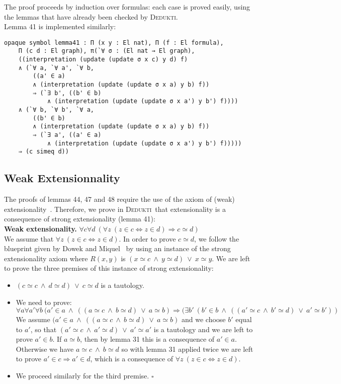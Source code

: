 \documentclass[submission,copyright,creativecommons]{eptcs}
\def\imp{\mathbin{\Rightarrow}}
\def\fa{{\forall}}
\def\conj{\mathbin{\wedge}}
\def\disj{\mathbin{\vee}}
\def\ex{{\exists}}
\newenvironment{proof}{\noindent {\em Proof.}}{\medskip}
\newcommand{\dedukti}{\textsc{Dedukti}}
\begin{document}
The proof proceeds by induction over formulas: each case is proved easily, using the lemmas that have already been checked by \dedukti. \\

Lemma 41 is implemented similarly:

\begin{lstlisting}
opaque symbol lemma41 : Π (x y : El nat), Π (f : El formula), 
	Π (c d : El graph), π(`∀ σ : (El nat → El graph), 
	((interpretation (update (update σ x c) y d) f)
	∧ (`∀ a, `∀ a', `∀ b, 
		((a' ∈ a) 
		∧ (interpretation (update (update σ x a) y b) f)) 
		⇒ (`∃ b', ((b' ∈ b) 
			∧ (interpretation (update (update σ x a') y b') f))))
	∧ (`∀ b, `∀ b', `∀ a, 
		((b' ∈ b) 
		∧ (interpretation (update (update σ x a) y b) f)) 
		⇒ (`∃ a', ((a' ∈ a) 
			∧ (interpretation (update (update σ x a') y b') f))))) 
	⇒ (c simeq d))
\end{lstlisting}

\subsection{Weak Extensionnality}

\label{extensionality}

The proofs of lemmas 44, 47 and 48 require the use of the axiom of (weak) extensionality~\cite{zermodulo53}. Therefore, we prove in \dedukti ~that extensionality is a consequence of strong extensionality (lemma 41):\\

\textbf{Weak extensionality.} $\fa c\fa d~ (\fa z~ (z \in c \Leftrightarrow z \in d) \imp c \simeq d)$ \\


\begin{proof}
We assume that $\fa z~ (z \in c \Leftrightarrow z \in d)$. In order to prove $c \simeq d$, we follow the blueprint given by Dowek and Miquel~\cite[see Proposition 1]{zermodulo} by using an instance of the strong extensionality axiom where $R(x,y)$ is $(x \simeq c~\conj~y \simeq d)~\disj~x \simeq y$. We are left to prove the three premises of this instance of strong extensionality:
\begin{itemize}
\item $(c \simeq c~\conj~d \simeq d)~\disj~c \simeq d$ is a tautology.
\item We need to prove:
$$\fa a\fa a'\fa b~(a' \in a~\conj~((a \simeq c~\conj~b \simeq d)~\disj~a \simeq b) \imp (\ex b'~ (b' \in b~\conj~((a' \simeq c~\conj~b' \simeq d)~\disj~a' \simeq b'))$$
We assume $(a' \in a~\conj~((a \simeq c~\conj~b \simeq d)~\disj~a \simeq b)$ and we choose $b'$ equal to $a'$, so that $(a' \simeq c~\conj~a' \simeq d)~\disj~a' \simeq a'$ is a tautology and we are left to prove $a' \in b$. If $a \simeq b$, then by lemma 31 this is a consequence of $a' \in a$. Otherwise we have $a \simeq c~\conj~b \simeq d$ so with lemma 31 applied twice we are left to prove $a' \in c \imp a' \in d$, which is a consequence of $\fa z~ (z \in c \Leftrightarrow z \in d)$.
\item We proceed similarly for the third premise. $\square$
\end{itemize}
\end{proof}
\end{document}
